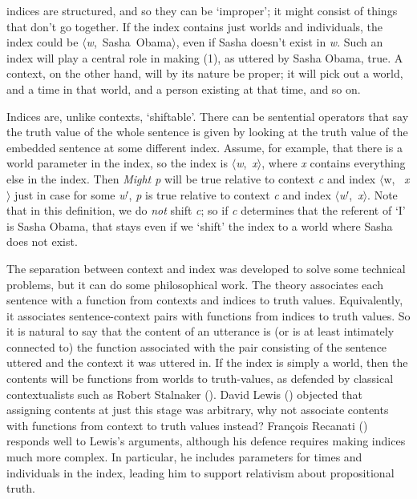 \documentclass[
  10pt,
  letterpaper,
  DIV=11,
  numbers=noendperiod,
  twoside]{scrartcl}
\begin{document}
indices are structured, and so they can be `improper'; it might consist
of things that don't go together. If the index contains just worlds and
individuals, the index could be
\(\langle\)\emph{w},~Sasha~Obama\(\rangle\), even if Sasha doesn't exist
in \emph{w}. Such an index will play a central role in making (1), as
uttered by Sasha Obama, true. A context, on the other hand, will by its
nature be proper; it will pick out a world, and a time in that world,
and a person existing at that time, and so on.

Indices are, unlike contexts, `shiftable'. There can be sentential
operators that say the truth value of the whole sentence is given by
looking at the truth value of the embedded sentence at some different
index. Assume, for example, that there is a world parameter in the
index, so the index is \(\langle\)\emph{w},~\emph{x}\(\rangle\), where
\emph{x} contains everything else in the index. Then \emph{Might p} will
be true relative to context \emph{c} and index \(\langle\)w,~
\emph{x}\(\rangle\) just in case for some \emph{w}′, \emph{p} is true
relative to context \emph{c} and index
\(\langle\)\emph{w}′,~\emph{x}\(\rangle\). Note that in this definition,
we do \emph{not} shift \emph{c}; so if \emph{c} determines that the
referent of `I' is Sasha Obama, that stays even if we `shift' the index
to a world where Sasha does not exist.

The separation between context and index was developed to solve some
technical problems, but it can do some philosophical work. The theory
associates each sentence with a function from contexts and indices to
truth values. Equivalently, it associates sentence-context pairs with
functions from indices to truth values. So it is natural to say that the
content of an utterance is (or is at least intimately connected to) the
function associated with the pair consisting of the sentence uttered and
the context it was uttered in. If the index is simply a world, then the
contents will be functions from worlds to truth-values, as defended by
classical contextualists such as Robert Stalnaker
(). David Lewis
() objected that assigning contents at
just this stage was arbitrary, why not associate contents with functions
from context to truth values instead? François Recanati
() responds well to Lewis's arguments,
although his defence requires making indices much more complex. In
particular, he includes parameters for times and individuals in the
index, leading him to support relativism about propositional truth.
\end{document}
